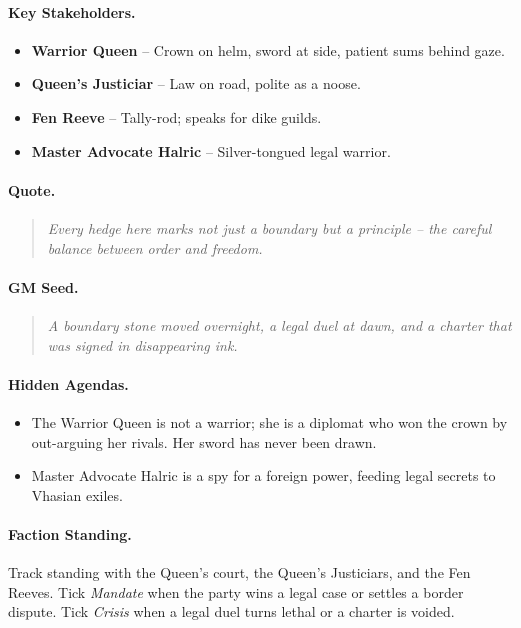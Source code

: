 \paragraph{Key Stakeholders.}
\begin{itemize}
  \item \textbf{Warrior Queen} -- Crown on helm, sword at side, patient sums behind gaze.
  \item \textbf{Queen's Justiciar} -- Law on road, polite as a noose.
  \item \textbf{Fen Reeve} -- Tally-rod; speaks for dike guilds.
  \item \textbf{Master Advocate Halric} -- Silver-tongued legal warrior.
\end{itemize}

\paragraph{Quote.}
\begin{quote}
\emph{\textquotedbl Every hedge here marks not just a boundary but a principle -- the careful balance between order and freedom.\textquotedbl}
\end{quote}

\paragraph{GM Seed.}
\begin{quote}
\emph{A boundary stone moved overnight, a legal duel at dawn, and a charter that was signed in disappearing ink.}
\end{quote}

\paragraph{Hidden Agendas.}
\begin{itemize}
  \item The Warrior Queen is not a warrior; she is a diplomat who won the crown by out-arguing her rivals. Her sword has never been drawn.
  \item Master Advocate Halric is a spy for a foreign power, feeding legal secrets to Vhasian exiles.
\end{itemize}

\paragraph{Faction Standing.}
Track standing with the Queen's court, the Queen's Justiciars, and the Fen Reeves. Tick \textit{Mandate} when the party wins a legal case or settles a border dispute. Tick \textit{Crisis} when a legal duel turns lethal or a charter is voided.

